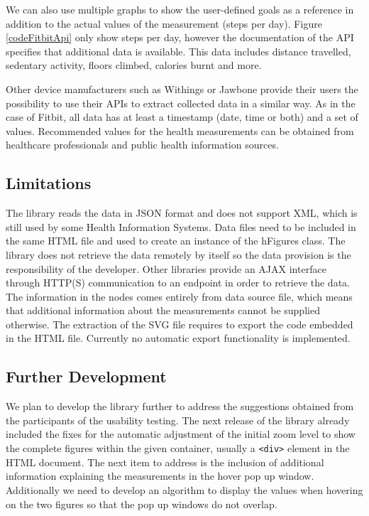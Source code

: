 \documentclass[twocolumn]{bmcart}%
\begin{document}
We can also use multiple graphs to show the user-defined goals as a reference in addition to the actual values of the measurement (steps per day). Figure \ref{codeFitbitApi} only show steps per day, however the documentation of the API specifies that additional data is available. This data includes distance travelled, sedentary activity, floors climbed, calories burnt and more.

Other device manufacturers such as Withings or Jawbone provide their users the possibility to use their APIs to extract collected data in a similar way. As in the case of Fitbit, all data has at least a timestamp (date, time or both) and a set of values. Recommended values for the health measurements can be obtained from healthcare professionals and public health information sources.


\subsection*{Limitations}

The library reads the data in JSON format and does not support XML, which is still used by some Health Information Systems. Data files need to be included in the same HTML file and used to create an instance of the hFigures class. The library does not retrieve the data remotely by itself so the data provision is the responsibility of the developer. Other libraries provide an AJAX interface through HTTP(S) communication to an endpoint in order to retrieve the data. The information in the nodes comes entirely from data source file, which means that additional information about the measurements cannot be supplied otherwise. The extraction of the SVG file requires to export the code embedded in the HTML file. Currently no automatic export functionality is implemented.

\subsection*{Further Development}

We plan to develop the library further to address the suggestions obtained from the participants of the usability testing. The next release of the library already included the fixes for the automatic adjustment of the initial zoom level to show the complete figures within the given container, usually a \texttt{<div>} element in the HTML document. The next item to address is the inclusion of additional information explaining the measurements in the hover pop up window. Additionally we need to develop an algorithm to display the values when hovering on the two figures so that the pop up windows do not overlap.
\end{document}

